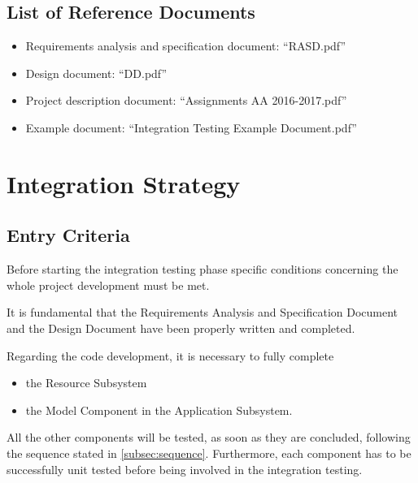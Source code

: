 \documentclass[english]{article}
\begin{document}
\subsection{List of Reference Documents}

\begin{itemize}
	\item{Requirements analysis and specification document: “RASD.pdf”}
	\item{Design document: “DD.pdf”}
	\item{Project description document: “Assignments AA 2016-2017.pdf”}
	\item{Example document: “Integration Testing Example Document.pdf”}
\end{itemize}

\section{Integration Strategy}

\subsection{Entry Criteria}

Before starting the integration testing phase specific conditions concerning the whole project development must be met.

It is fundamental that the Requirements Analysis and Specification Document and the Design Document have been properly written and completed.

Regarding the code development, it is necessary to fully complete 
\begin{itemize}
\item the Resource Subsystem
\item the Model Component in the Application Subsystem.
\end{itemize}
All the other components will be tested, as soon as they are concluded, following the sequence stated in \autoref{subsec:sequence}.
Furthermore, each component has to be successfully unit tested before being involved in the integration testing.

\end{document}
